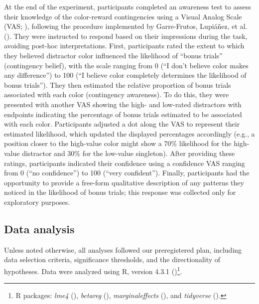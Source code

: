 \documentclass[
  man,
  floatsintext,
  longtable,
  nolmodern,
  notxfonts,
  notimes,
  mask,
  colorlinks=true,linkcolor=blue,citecolor=blue,urlcolor=blue]{apa7}
\begin{document}
At the end of the experiment, participants completed an awareness test
to assess their knowledge of the color-reward contingencies using a
Visual Analog Scale (VAS; ), following the procedure implemented by Garre-Frutos, Lupiáñez,
et al. (). They were instructed to
respond based on their impressions during the task, avoiding post-hoc
interpretations. First, participants rated the extent to which they
believed distractor color influenced the likelihood of ``bonus trials''
(contingency belief), with the scale ranging from 0 (``I don't believe
color makes any difference'') to 100 (``I believe color completely
determines the likelihood of bonus trials''). They then estimated the
relative proportion of bonus trials associated with each color
(contingency awareness). To do this, they were presented with another
VAS showing the high- and low-rated distractors with endpoints
indicating the percentage of bonus trials estimated to be associated
with each color. Participants adjusted a dot along the VAS to represent
their estimated likelihood, which updated the displayed percentages
accordingly (e.g., a position closer to the high-value color might show
a 70\% likelihood for the high-value distractor and 30\% for the
low-value singleton). After providing these ratings, participants
indicated their confidence using a confidence VAS ranging from 0 (``no
confidence'') to 100 (``very confident''). Finally, participants had the
opportunity to provide a free-form qualitative description of any
patterns they noticed in the likelihood of bonus trials; this response
was collected only for exploratory purposes.

\subsection{Data analysis}\label{data-analysis}

Unless noted otherwise, all analyses followed our preregistered plan,
including data selection criteria, significance thresholds, and the
directionality of hypotheses. Data were analyzed using R, version 4.3.1
()\footnote{R packages:
  \emph{lme4} (),
  \emph{betareg} (), \emph{marginaleffects}
  (),
  and \emph{tidyverse} ().}.
\end{document}
